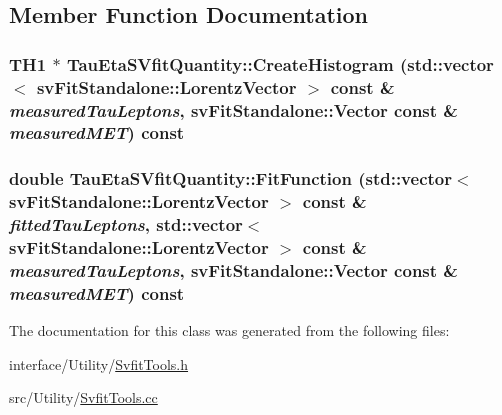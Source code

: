 \subsection{Member Function Documentation}
\hypertarget{classTauEtaSVfitQuantity_a4b2d7ac673195e81b28a9c60e9dd0160}{
\subsubsection[{CreateHistogram}]{\setlength{\rightskip}{0pt plus 5cm}TH1 $\ast$ TauEtaSVfitQuantity::CreateHistogram (std::vector$<$ svFitStandalone::LorentzVector $>$ const \& {\em measuredTauLeptons}, \/  svFitStandalone::Vector const \& {\em measuredMET}) const}}
\label{classTauEtaSVfitQuantity_a4b2d7ac673195e81b28a9c60e9dd0160}
\hypertarget{classTauEtaSVfitQuantity_a4504c53a6e351cabadfc3c219bbe84c5}{
\subsubsection[{FitFunction}]{\setlength{\rightskip}{0pt plus 5cm}double TauEtaSVfitQuantity::FitFunction (std::vector$<$ svFitStandalone::LorentzVector $>$ const \& {\em fittedTauLeptons}, \/  std::vector$<$ svFitStandalone::LorentzVector $>$ const \& {\em measuredTauLeptons}, \/  svFitStandalone::Vector const \& {\em measuredMET}) const}}
\label{classTauEtaSVfitQuantity_a4504c53a6e351cabadfc3c219bbe84c5}


The documentation for this class was generated from the following files:\begin{DoxyCompactItemize}
\item 
interface/Utility/\hyperlink{SvfitTools_8h}{SvfitTools.h}\item 
src/Utility/\hyperlink{SvfitTools_8cc}{SvfitTools.cc}\end{DoxyCompactItemize}
